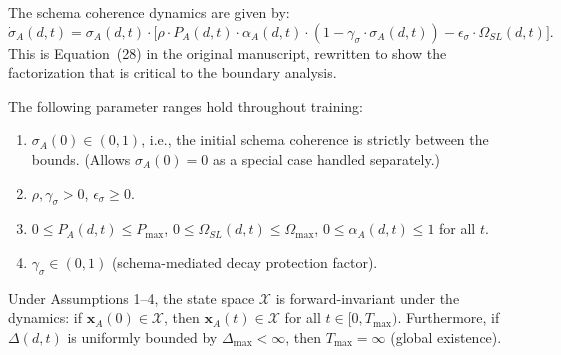 
\begin{definition}
The schema coherence dynamics are given by:
\begin{equation}\label{eq:sigma-ode-recon}
\dot{\sigma}_A(d,t) = \sigma_A(d,t) \cdot
\bigl[ \rho \cdot P_A(d,t) \cdot \alpha_A(d,t) \cdot (1 - \gamma_\sigma \cdot \sigma_A(d,t))
- \epsilon_\sigma \cdot \Omega_{SL}(d,t) \bigr].
\end{equation}
This is Equation~(28) in the original manuscript, rewritten to show the
factorization that is critical to the boundary analysis.
\end{definition}

\begin{assumption}
The following parameter ranges hold throughout training:
\begin{enumerate}[nosep]
\item $\sigma_A(0) \in (0, 1)$, i.e., the initial schema coherence is
  strictly between the bounds. (Allows $\sigma_A(0) = 0$ as a special
  case handled separately.)
\item $\rho, \gamma_\sigma > 0$, $\epsilon_\sigma \geq 0$.
\item $0 \leq P_A(d,t) \leq P_{\max}$, $0 \leq \Omega_{SL}(d,t) \leq \Omega_{\max}$,
  $0 \leq \alpha_A(d,t) \leq 1$ for all $t$.
\item $\gamma_\sigma \in (0, 1)$ (schema-mediated decay protection factor).
\end{enumerate}
\end{assumption}

\begin{proposition}
\label{prop:invariance}
Under Assumptions 1--4, the state space $\mathcal{X}$ is
forward-invariant under the dynamics: if $\mathbf{x}_A(0) \in \mathcal{X}$,
then $\mathbf{x}_A(t) \in \mathcal{X}$ for all $t \in [0, T_{\max})$.
Furthermore, if $\Delta(d,t)$ is uniformly bounded by $\Delta_{\max} < \infty$,
then $T_{\max} = \infty$ (global existence).
\end{proposition}

